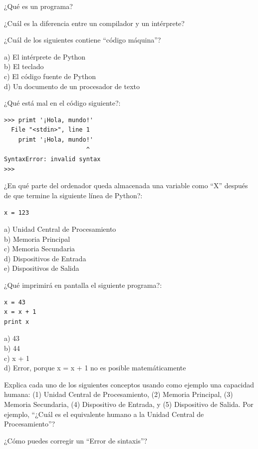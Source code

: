 \begin{ex}
¿Qué es un programa?
\end{ex}

\begin{ex}
¿Cuál es la diferencia entre un compilador y un intérprete?
\end{ex}

\begin{ex}
¿Cuál de los siguientes contiene ``código máquina''?

a) El intérprete de Python\\
b) El teclado\\
c) El código fuente de Python\\
d) Un documento de un procesador de texto
\end{ex}

\begin{ex}
¿Qué está mal en el código siguiente?:

\beforeverb
\begin{verbatim}
>>> primt '¡Hola, mundo!'
  File "<stdin>", line 1
    primt '¡Hola, mundo!'
                       ^
SyntaxError: invalid syntax
>>> 
\end{verbatim}
\afterverb

\end{ex}

\begin{ex}
¿En qué parte del ordenador queda almacenada una variable como ``X''
después de que termine la siguiente línea de Python?:

\beforeverb
\begin{verbatim}
x = 123
\end{verbatim}
\afterverb
%
a) Unidad Central de Procesamiento\\
b) Memoria Principal\\
c) Memoria Secundaria\\
d) Dispositivos de Entrada\\
e) Dispositivos de Salida
\end{ex}

\begin{ex}
¿Qué imprimirá en pantalla el siguiente programa?:

\beforeverb
\begin{verbatim}
x = 43
x = x + 1
print x
\end{verbatim}
\afterverb
%
a) 43\\
b) 44\\
c) x + 1\\
d) Error, porque x = x + 1 no es posible matemáticamente
\end{ex}

\begin{ex}
Explica cada uno de los siguientes conceptos usando como ejemplo una capacidad humana:
(1) Unidad Central de Procesamiento, (2) Memoria Principal, (3) Memoria Secundaria, 
(4) Dispositivo de Entrada, y
(5) Dispositivo de Salida.
Por ejemplo, ``¿Cuál es el equivalente humano a la Unidad Central de Procesamiento''? 
\end{ex}

\begin{ex}
¿Cómo puedes corregir un ``Error de sintaxis''?
\end{ex}